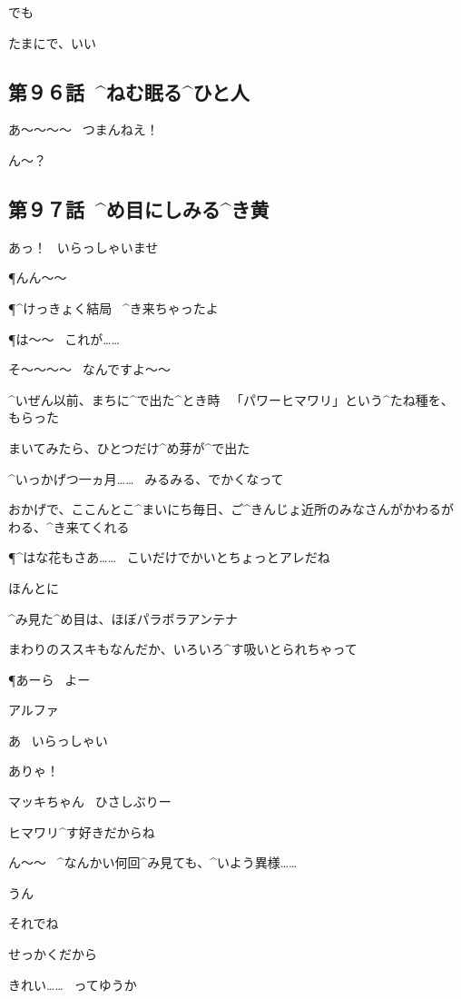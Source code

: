 \A でも

\A たまにで、いい


\subsection{第９６話\ ^{ねむ}{眠}る^{ひと}{人}}

\page[118]
\M あ〜〜〜〜
\ つまんねえ！

\T ん〜？


\subsection{第９７話\ ^{め}{目}にしみる^{き}{黄}}

\page[127]
\A あっ！
\ いらっしゃいませ

\P んん〜〜

\P ^{けっきょく}{結局}
\ ^{き}{来}ちゃったよ

\P は〜〜
\ これが……

\A そ〜〜〜〜
\ なんですよ〜〜

\page[129]
\A ^{いぜん}{以前}、まちに^{で}{出}た^{とき}{時}
\ 「パワーヒマワリ」という^{たね}{種}を、もらった

\A まいてみたら、ひとつだけ^{め}{芽}が^{で}{出}た

\A ^{いっかげつ}{一ヵ月}……
\ みるみる、でかくなって

\page
\A おかげで、ここんとこ^{まいにち}{毎日}、ご^{きんじょ}{近所}のみなさんがかわるがわる、^{き}{来}てくれる

\P ^{はな}{花}もさあ……
\ こいだけでかいとちょっとアレだね

\A ほんとに

\page
\A ^{み}{見}た^{め}{目}は、ほぼパラボラアンテナ

\A まわりのススキもなんだか、いろいろ^{す}{吸}いとられちゃって

\P あーら
\ よー

\page
\T アルファ

\A あ
\ いらっしゃい

\A ありゃ！

\A マッキちゃん
\ ひさしぶりー

\M ヒマワリ^{す}{好}きだからね

\page
\T ん〜〜
\ ^{なんかい}{何回}^{み}{見}ても、^{いよう}{異様}……

\A うん

\T それでね

\T せっかくだから

\page[135]
\A きれい……
\ ってゆうか

